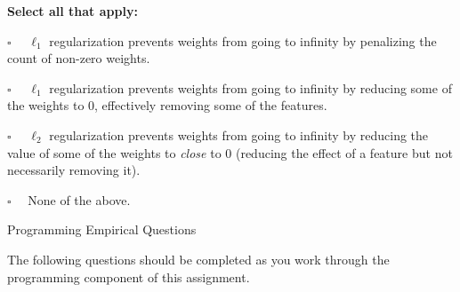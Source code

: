 \documentclass[11pt,addpoints,answers]{exam}
\newcommand{\emptysquare}{{\LARGE $\square$}\ \ }
\newcommand{\filledsquare}{{\LARGE $\boxtimes$}\ \ }
\begin{document}
\begin{questions}
\begin{parts}
    \textbf{Select all that apply:}
    \begin{list}{}
        \item 
            \emptysquare
            $\ell_1$ regularization prevents weights from going to infinity by penalizing the count of non-zero weights.
        \item 
            \emptysquare
            $\ell_1$ regularization prevents weights from going to infinity by reducing some of the weights to 0, effectively removing some of the features. 
        \item 
            \emptysquare
            $\ell_2$ regularization prevents weights from going to infinity by reducing the value of some of the weights to \textit{close} to 0 (reducing the effect of a feature but not necessarily removing it). 
        \item 
            \emptysquare
            None of the above.
    \end{list}

    
    \clearpage
   
\end{parts}


{\Large \question Programming Empirical Questions}
\label{sec:empirical}

The following questions should be completed as you work through the programming component of this assignment.

\end{questions}
\end{document}
